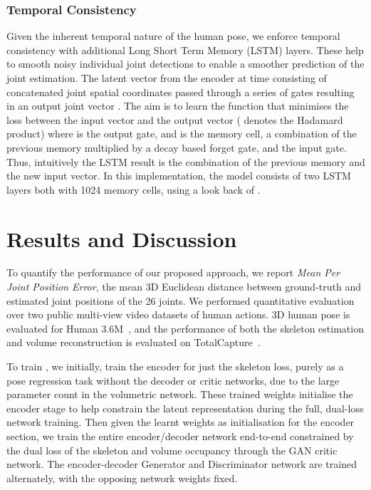 \documentclass{bmvc2k}
\newcommand{\squeezeup}{\vspace{-2mm}}
\begin{document}
\subsubsection{Temporal Consistency}
\label{sec:TempConsistency}
Given the inherent temporal nature of the human pose, we enforce temporal consistency with additional Long Short Term Memory (LSTM) layers. These help to smooth noisy individual joint detections to enable a smoother prediction of the joint estimation. The latent vector from the encoder  at time  consisting of concatenated joint spatial coordinates passed through a series of gates resulting in an output joint vector . The aim is to learn the function that minimises the loss between the input vector and the output vector  ( denotes the Hadamard product) where  is the output gate, and  is the memory cell, a combination of the previous memory  multiplied by a decay based forget gate, and the input gate. Thus, intuitively the LSTM result is the combination of the previous memory and the new input vector. In this implementation, the model consists of two LSTM layers both with 1024 memory cells, using a look back of .

\squeezeup
\squeezeup
\section{Results and Discussion}

\label{sec:TCSetup}
To quantify the performance of our proposed approach, we report \emph{Mean Per Joint Position Error}, the mean 3D Euclidean distance between ground-truth and estimated joint positions of the 26 joints. We performed quantitative evaluation over two public multi-view video datasets of human actions. 3D human pose is evaluated for Human 3.6M~\cite{h36m_pami}, and the performance of both the skeleton estimation and volume reconstruction is evaluated on TotalCapture~\cite{trumble_total_2017}.


To train , 
we initially, train the encoder for just the skeleton loss, purely as a pose regression task without the decoder or critic networks, due to the large parameter count in the volumetric network. These trained weights initialise the encoder stage to help constrain the latent representation during the full, dual-loss network training. Then given the learnt weights as initialisation for the encoder section, we train the entire encoder/decoder network end-to-end constrained by the dual loss of the skeleton and volume occupancy through the GAN critic network. The encoder-decoder Generator and Discriminator network are trained alternately, with the opposing network weights fixed. 
\end{document}
